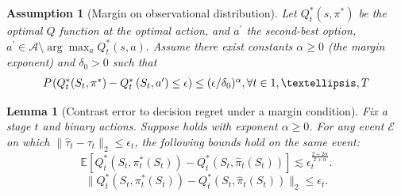 \documentclass[10pt,a4paper]{amsart}
\newtheorem{assumption}{Assumption}
\newtheorem{lemma}{Lemma}
\newcommand{\E}{\mathbb{E}}
\newcommand{\blipadv}{\tau}
\newcommand{\norm}[1]{\lVert#1\rVert}
\begin{document}
\begin{assumption}[Margin on observational distribution]\label{asn-margin-observational-pib}
Let $Q^{*}_t(s, \pi^*)$ be the optimal $Q$ function at the optimal action, and $a^{\prime}$ the second-best option, $a^{\prime} \in \mathcal{A}\setminus \arg \max _a Q^{*}_t(s, a).$
Assume there exist constants $\alpha\geq0$ (the margin exponent) and
$\delta_0>0$ such that
$$
\begin{aligned}
\textstyle
P_{ 
}
\left( Q^{*}_t(S_t, \pi^*)
-Q^{*}_t\left(S_t, a^{\prime}\right) \leq \epsilon\right)
\leq (\epsilon/\delta_0)^\alpha
, \forall t \in 1, \dots, T
\end{aligned}
$$
\end{assumption}

\begin{lemma}[Contrast error to decision regret under a margin condition]
\label{lemma-adverror-to-value}
Fix a stage $t$ and binary actions. Suppose  holds with
exponent $\alpha\geq0$. For any event $\mathcal E$ on which
$\norm{\hat\blipadv_t-\blipadv_t}_2\leq\epsilon_t$, the following bounds hold
on the same event:
\begin{equation*}
\E\!\left[
Q_t^*(S_t,\pi_t^*(S_t))-Q_t^*(S_t,\hat\pi_t(S_t))
\right]
\lesssim
\epsilon_t^{\frac{2+2\alpha}{2+\alpha}}.
\end{equation*}
\begin{equation*}
\norm{
Q_t^*(S_t,\pi_t^*(S_t))-Q_t^*(S_t,\hat\pi_t(S_t))
}_2
\leq\epsilon_t.
\end{equation*}
\end{lemma}
\end{document}
